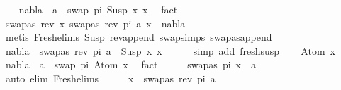\begin{isabellebody}
\ \ \isamarkupfalse%
\ {\isachardoublequoteopen}nabla\ {\isasymturnstile}\ a\ {\isasymsharp}\ swap\ pi\ {\isacharparenleft}{\kern0pt}Susp\ x{}\ x{}{\isacharparenright}{\kern0pt}{\isachardoublequoteclose}\ \isamarkupfalse%
\ fact\isanewline
\ \ \isamarkupfalse%
\ {\isachardoublequoteopen}{\isacharparenleft}{\kern0pt}swapas\ {\isacharparenleft}{\kern0pt}rev\ x{}{\isacharparenright}{\kern0pt}\ {\isacharparenleft}{\kern0pt}swapas\ {\isacharparenleft}{\kern0pt}rev\ pi{\isacharparenright}{\kern0pt}\ a{\isacharparenright}{\kern0pt}{\isacharcomma}{\kern0pt}\ x{}{\isacharparenright}{\kern0pt}\ {\isasymin}\ nabla{\isachardoublequoteclose}\isanewline
\ \ \ \ \isamarkupfalse%
\ {\isacharparenleft}{\kern0pt}metis\ Fresh{\isacharunderscore}{\kern0pt}elims{\isacharparenleft}{\kern0pt}{}{\isacharparenright}{\kern0pt}\ Susp\ rev{\isacharunderscore}{\kern0pt}append\ swap{\isachardot}{\kern0pt}simps{\isacharparenleft}{\kern0pt}{}{\isacharparenright}{\kern0pt}\ swapas{\isacharunderscore}{\kern0pt}append{\isacharparenright}{\kern0pt}\ \isanewline
\ \ \isamarkupfalse%
\ \isamarkupfalse%
\ {\isachardoublequoteopen}nabla\ {\isasymturnstile}\ swapas\ {\isacharparenleft}{\kern0pt}rev\ pi{\isacharparenright}{\kern0pt}\ a\ {\isasymsharp}\ Susp\ x{}\ x{}{\isachardoublequoteclose}\isanewline
\ \ \ \ \isamarkupfalse%
\ {\isacharparenleft}{\kern0pt}simp\ add{\isacharcolon}{\kern0pt}\ fresh{\isacharunderscore}{\kern0pt}susp{\isacharparenright}{\kern0pt}\isanewline
{}\isamarkupfalse%
\isanewline
\ \ \isamarkupfalse%
\ {\isacharparenleft}{\kern0pt}Atom\ x{\isacharparenright}{\kern0pt}\isanewline
\ \ \isamarkupfalse%
\ {\isachardoublequoteopen}nabla\ {\isasymturnstile}\ a\ {\isasymsharp}\ swap\ pi\ {\isacharparenleft}{\kern0pt}Atom\ x{\isacharparenright}{\kern0pt}{\isachardoublequoteclose}\ \isamarkupfalse%
\ fact\isanewline
\ \ \isamarkupfalse%
\ \isamarkupfalse%
\ {\isachardoublequoteopen}swapas\ pi\ x\ {\isasymnoteq}\ a{\isachardoublequoteclose}\ \isamarkupfalse%
\ {\isacharparenleft}{\kern0pt}auto\ elim{\isacharcolon}{\kern0pt}\ Fresh{\isacharunderscore}{\kern0pt}elims{\isacharparenright}{\kern0pt}\isanewline
\ \ \isamarkupfalse%
\ \isamarkupfalse%
\ {\isachardoublequoteopen}x\ {\isasymnoteq}\ swapas\ {\isacharparenleft}{\kern0pt}rev\ pi{\isacharparenright}{\kern0pt}\ a{\isachardoublequoteclose}\ \isamarkupfalse%

\end{isabellebody}
